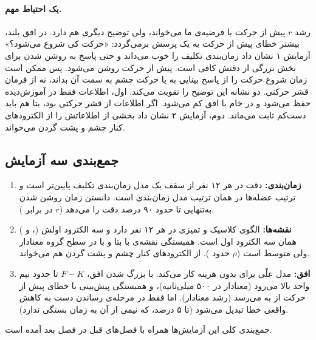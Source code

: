 

\paragraph{یک احتیاط مهم.} رشد $r$ پیش از حرکت با فرضیه‌ی ما می‌خواند، ولی توضیح دیگری هم دارد. در افق بلند، بیشتر خطای  پیش از حرکت به یک پرسش برمی‌گردد: «حرکت کی شروع می‌شود؟» آزمایش ۱ نشان داد  زمان‌بندی تکلیف را خوب می‌داند و حتی پاسخ به روشن شدن  برای بخش بزرگی از دقتش کافی است.  پیش از حرکت روشن می‌شود. پس  ممکن است زمان شروع حرکت را از پاسخ بینایی به  یا حرکت چشم به سمت آن بداند، نه از فرمان قشر حرکتی. دو نشانه این توضیح را تقویت می‌کند. اول، اطلاعات فقط در  آموزش‌دیده حفظ می‌شود و در  خام با افق کم می‌شود. اگر اطلاعات از  قشر حرکتی بود،  بتا هم باید دست‌کم ثابت می‌ماند. دوم، آزمایش ۲ نشان داد  بخشی از اطلاعاتش را از الکترودهای کنار چشم و پشت گردن می‌خواند.

\FloatBarrier
\subsection{جمع‌بندی سه آزمایش}

\begin{enumerate}
\item \textbf{زمان‌بندی:} دقت  در هر ۱۲ نفر از سقف یک مدل زمان‌بندی تکلیف پایین‌تر است و ترتیب عضله‌ها در  همان ترتیب مدل زمان‌بندی است. دانستن زمان روشن شدن  به‌تنهایی تا حدود ۹۰ درصد دقت  را می‌دهد ($r$  در برابر ).
\item \textbf{نقشه‌ها:}  الگوی کلاسیک و تمیزی در هر ۱۲ نفر دارد و سه الکترود اولش (،  و ) همان سه الکترود اول  است. همبستگی نقشه‌ی  با  بتا و با  در سطح گروه معنادار ولی متوسط است ($\rho$ حدود ).  از الکترودهای کنار چشم و پشت گردن هم می‌خواند.
\item \textbf{افق:} مدل علّی برای  بدون هزینه کار می‌کند. با بزرگ شدن افق، $F-K$ تا حدود نیم واحد  بالا می‌رود (معنادار در ۵۰۰ میلی‌ثانیه)، و همبستگی پیش‌بینی  با خطای  پیش از حرکت از  به  می‌رسد (رشد معنادار). اما فقط در مرحله‌ی رساندن دست به کاهش واقعی خطا تبدیل می‌شود (تا ۵ درصد، که نیمی از آن به زمان بستگی ندارد).
\end{enumerate}

جمع‌بندی کلی این آزمایش‌ها همراه با فصل‌های قبل در فصل بعد آمده است.

